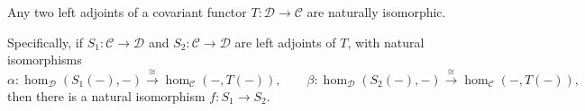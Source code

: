Any two left adjoints of a covariant functor $T : \mathcal{D} \to \mathcal{C}$ are naturally isomorphic.

Specifically, if $S_1 : \mathcal{C} \to \mathcal{D}$ and $S_2 : \mathcal{C} \to \mathcal{D}$ are left adjoints of $T$, with natural isomorphisms
\[
\alpha : \hom_{\mathcal{D}}(S_1(-), -) \xrightarrow{\cong} \hom_{\mathcal{C}}(-, T(-)), \qquad
\beta : \hom_{\mathcal{D}}(S_2(-), -) \xrightarrow{\cong} \hom_{\mathcal{C}}(-, T(-)),
\]
then there is a natural isomorphism $f : S_1 \to S_2$.
